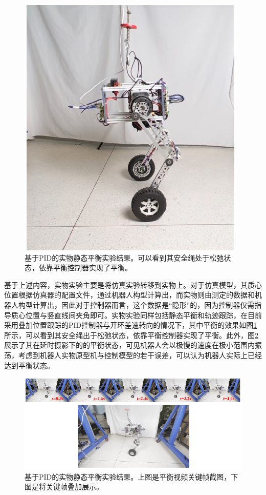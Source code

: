 \begin{figure}[h!]
  \centering
  \includegraphics[width=0.45\linewidth]{figures/Sec5/simplerealresult.png}
  \caption{
  基于PID的实物静态平衡实验结果。可以看到其安全绳处于松弛状态，依靠平衡控制器实现了平衡。
  }
  \label{fig:sec5-simplerealresult}
   \vspace{6pt}
\end{figure}

基于上述内容，实物实验主要是将仿真实验转移到实物上。对于仿真模型，其质心位置根据仿真器的配置文件，通过机器人构型计算出，而实物则由测定的数据和机器人构型计算出，因此对于控制器而言，这个数据是“隐形”的，因为控制器仅需指导质心位置与竖直线间夹角即可。实物实验同样包括静态平衡和轨迹跟踪，在目前采用叠加位置跟踪的PID控制器与开环差速转向的情况下，其中平衡的效果如图\ref{fig:sec5-simplerealresult}所示，可以看到其安全绳出于松弛状态，依靠平衡控制器实现了平衡。此外，图\ref{fig:sec5-static}展示了其在延时摄影下的的平衡状态，可见机器人会以极慢的速度在极小范围内振荡，考虑到机器人实物原型机与控制模型的若干误差，可以认为机器人实际上已经达到平衡状态。

\begin{figure}[h!]
  \centering
  \includegraphics[width=1.0\linewidth]{figures/Sec5/static.png}
  \caption{
  基于PID的实物静态平衡实验结果。上图是平衡视频关键帧截图，下图是将关键帧叠加展示。
  }
  \label{fig:sec5-static}
   \vspace{6pt}
\end{figure}

